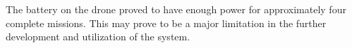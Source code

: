 The battery on the drone proved to have enough power for approximately four complete missions. This may prove to be a major limitation in the further development and utilization of the system.



\FloatBarrier

